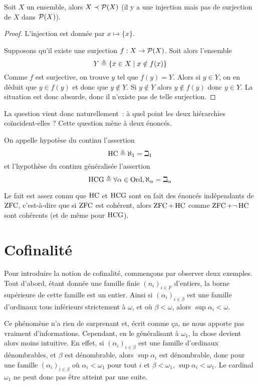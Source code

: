 \begin{theorem}[Cantor]
  Soit $X$ un ensemble, alors $X \prec \mathcal{P}(X)$ (il y a une injection mais
  pas de surjection de $X$ dans $\mathcal{P}(X)$).
\end{theorem}

\begin{proof}
  L'injection est donnée par $x \mapsto \{x\}$.

  Supposons qu'il existe une surjection $f : X \to \mathcal{P}(X)$. Soit alors
  l'ensemble
  \[Y\triangleq \{x\in X\mid x\notin f(x)\}\]
  Comme $f$ est surjective, on trouve $y$ tel que $f(y) = Y$. Alors si
  $y\in Y$, on en déduit que $y\in f(y)$ et donc que $y\notin Y$. Si
  $y\notin Y$ alors $y\notin f(y)$ donc $y\in Y$. La situation est donc absurde,
  donc il n'existe pas de telle surjection.
\end{proof}

La question vient donc naturellement~: à quel point les deux hiérarchies
coïncident-elles ? Cette question mène à deux énoncés.

\begin{definition}
  On appelle hypotèse du continu l'assertion
  \[\operatorname{HC} \triangleq \aleph_1 = \beth_1\]
  et l'hypothèse du continu généralisée l'assertion
  \[\operatorname{HCG} \triangleq \forall \alpha \in \operatorname{Ord}, \aleph_\alpha = \beth_\alpha\]
\end{definition}

Le fait est assez connu que $\operatorname{HC}$ et $\operatorname{HCG}$ sont en fait des énoncés
indépendants de $\operatorname{ZFC}$, c'est-à-dire que si $\operatorname{ZFC}$ est cohérent, alors
$\operatorname{ZFC} + \operatorname{HC}$ comme $\operatorname{ZFC} + \lnot\operatorname{HC}$ sont cohérents (et de même pour $\operatorname{HCG}$).

\section{Cofinalité}

Pour introduire la notion de cofinalité, commençons par observer deux exemples.
Tout d'abord, étant donnée une famille finie $(n_i)_{i\in F}$ d'entiers, la borne
supérieure de cette famille est un entier. Ainsi si $(\alpha_i)_{i\in \beta}$ est
une famille d'ordinaux tous inférieurs strictement à $\omega$, et où
$\beta < \omega$, alors $\sup \alpha_i < \omega$.

Ce phénomène n'a rien de surprenant et, écrit comme ça, ne nous apporte pas
vraiment d'informations. Cependant, en le généralisant à $\omega_1$, la chose
devient alors moins intuitive. En effet, si $(\alpha_i)_{i\in \beta}$ est une
famille d'ordinaux dénombrables, et $\beta$ est dénombrable, alors
$\sup \alpha_i$ est dénombrable, donc pour une famille
$(\alpha_i)_{i\in \beta}$ où $\alpha_i < \omega_1$ pour tout $i$ et
$\beta < \omega_1$, $\sup \alpha_i < \omega_1$. Le cardinal $\omega_1$ ne peut
donc pas être atteint par une suite.

